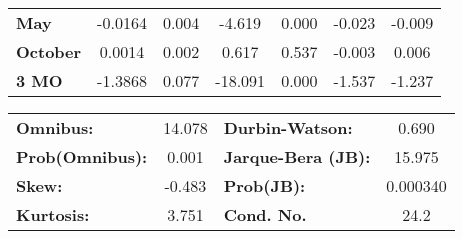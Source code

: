 \begin{center}
\begin{tabular}{lcccccc}
\textbf{May}      &      -0.0164  &        0.004     &    -4.619  &         0.000        &       -0.023    &       -0.009     \\
\textbf{October}  &       0.0014  &        0.002     &     0.617  &         0.537        &       -0.003    &        0.006     \\
\textbf{3 MO}     &      -1.3868  &        0.077     &   -18.091  &         0.000        &       -1.537    &       -1.237     \\
\bottomrule
\end{tabular}
\begin{tabular}{lclc}
\textbf{Omnibus:}       & 14.078 & \textbf{  Durbin-Watson:     } &    0.690  \\
\textbf{Prob(Omnibus):} &  0.001 & \textbf{  Jarque-Bera (JB):  } &   15.975  \\
\textbf{Skew:}          & -0.483 & \textbf{  Prob(JB):          } & 0.000340  \\
\textbf{Kurtosis:}      &  3.751 & \textbf{  Cond. No.          } &     24.2  \\
\bottomrule
\end{tabular}
\end{center}

